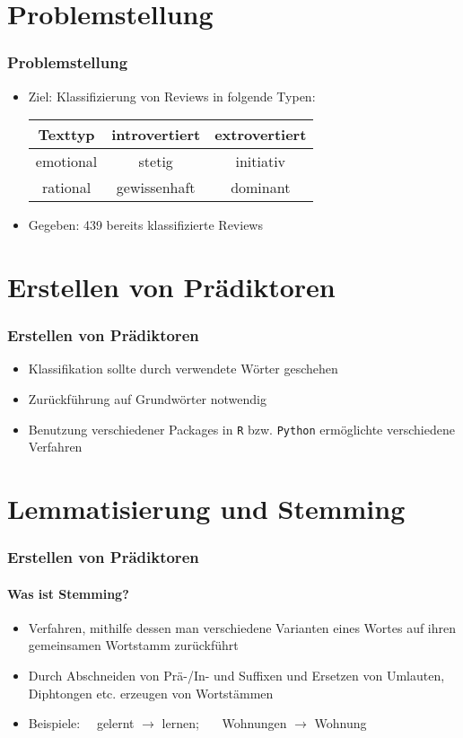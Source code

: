 \section{Problemstellung}
\begin{frame}
\frametitle{Problemstellung}
\begin{itemize}\setlength\parskip{12pt}
\item Ziel: Klassifizierung von Reviews in folgende Typen:
\begin{center}
\begin{tabular}{c|c|c}
Texttyp & introvertiert & extrovertiert \\
\hline 
emotional & stetig & initiativ\\
rational & gewissenhaft & dominant
\end{tabular}
\end{center}
\item Gegeben: 439 bereits klassifizierte Reviews
\end{itemize}
\end{frame}


\section{Erstellen von Prädiktoren}
\begin{frame}
\frametitle{Erstellen von Prädiktoren}
\begin{itemize}\itemsep12pt
\item Klassifikation sollte durch verwendete Wörter geschehen
\item Zurückführung auf Grundwörter notwendig
\item Benutzung verschiedener Packages in \texttt{R} bzw. \texttt{Python} ermöglichte verschiedene Verfahren
\end{itemize}
\end{frame}

\section{Lemmatisierung und Stemming}
\begin{frame}
\frametitle{Erstellen von Prädiktoren}
\framesubtitle{Was ist Stemming?}
\begin{itemize}\setlength\parskip{12pt}
	\item Verfahren, mithilfe dessen man verschiedene Varianten eines Wortes auf ihren gemeinsamen Wortstamm zurückführt
	\item Durch Abschneiden von Prä-/In- und Suffixen und Ersetzen von Umlauten, Diphtongen etc. erzeugen von Wortstämmen
	\item Beispiele: \ \ gelernt $\rightarrow$ lernen; \ \ \ Wohnungen $\rightarrow$ Wohnung
	

\end{itemize}

\end{frame}

